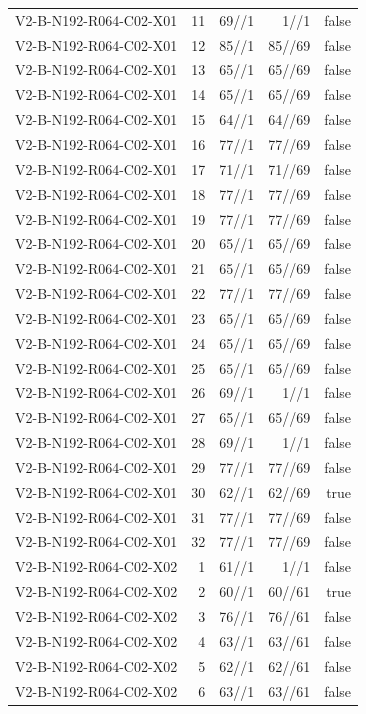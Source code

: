 {\begin{longtable}{lrrrr}
V2-B-N192-R064-C02-X01 & 11 & 69//1 & 1//1 & false \\
V2-B-N192-R064-C02-X01 & 12 & 85//1 & 85//69 & false \\
V2-B-N192-R064-C02-X01 & 13 & 65//1 & 65//69 & false \\
V2-B-N192-R064-C02-X01 & 14 & 65//1 & 65//69 & false \\
V2-B-N192-R064-C02-X01 & 15 & 64//1 & 64//69 & false \\
V2-B-N192-R064-C02-X01 & 16 & 77//1 & 77//69 & false \\
V2-B-N192-R064-C02-X01 & 17 & 71//1 & 71//69 & false \\
V2-B-N192-R064-C02-X01 & 18 & 77//1 & 77//69 & false \\
V2-B-N192-R064-C02-X01 & 19 & 77//1 & 77//69 & false \\
V2-B-N192-R064-C02-X01 & 20 & 65//1 & 65//69 & false \\
V2-B-N192-R064-C02-X01 & 21 & 65//1 & 65//69 & false \\
V2-B-N192-R064-C02-X01 & 22 & 77//1 & 77//69 & false \\
V2-B-N192-R064-C02-X01 & 23 & 65//1 & 65//69 & false \\
V2-B-N192-R064-C02-X01 & 24 & 65//1 & 65//69 & false \\
V2-B-N192-R064-C02-X01 & 25 & 65//1 & 65//69 & false \\
V2-B-N192-R064-C02-X01 & 26 & 69//1 & 1//1 & false \\
V2-B-N192-R064-C02-X01 & 27 & 65//1 & 65//69 & false \\
V2-B-N192-R064-C02-X01 & 28 & 69//1 & 1//1 & false \\
V2-B-N192-R064-C02-X01 & 29 & 77//1 & 77//69 & false \\
V2-B-N192-R064-C02-X01 & 30 & 62//1 & 62//69 & true \\
V2-B-N192-R064-C02-X01 & 31 & 77//1 & 77//69 & false \\
V2-B-N192-R064-C02-X01 & 32 & 77//1 & 77//69 & false \\
V2-B-N192-R064-C02-X02 & 1 & 61//1 & 1//1 & false \\
V2-B-N192-R064-C02-X02 & 2 & 60//1 & 60//61 & true \\
V2-B-N192-R064-C02-X02 & 3 & 76//1 & 76//61 & false \\
V2-B-N192-R064-C02-X02 & 4 & 63//1 & 63//61 & false \\
V2-B-N192-R064-C02-X02 & 5 & 62//1 & 62//61 & false \\
V2-B-N192-R064-C02-X02 & 6 & 63//1 & 63//61 & false \\

\end{longtable}}

